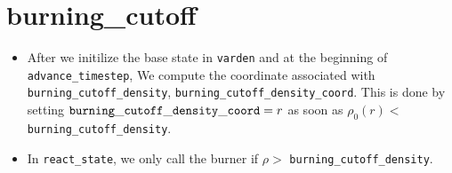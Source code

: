 \documentclass[11pt]{article}
\begin{document}
\section{burning\_cutoff}
\begin{itemize}
\item After we initilize the base state in {\tt varden} and at the beginning of {\tt advance\_timestep}, We compute the coordinate associated with {\tt burning\_cutoff\_density}, {\tt burning\_cutoff\_density\_coord}.  This is done by setting ${\tt burning\_cutoff\_density\_coord}= r$ as soon as $\rho_0(r) <$ {\tt burning\_cutoff\_density}.
\item In {\tt react\_state}, we only call the burner if $\rho >$ {\tt burning\_cutoff\_density}.
\end{itemize}
\end{document}
